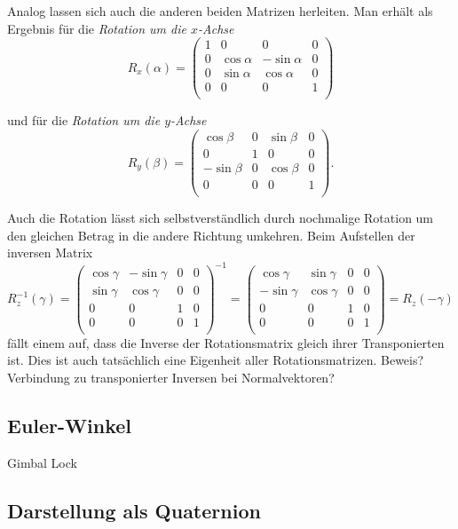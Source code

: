 Analog lassen sich auch die anderen beiden Matrizen herleiten. Man erhält als Ergebnis für die \emph{Rotation um die $x$-Achse}
\begin{equation}
 R_x{(\alpha)}
 = 
 \begin{pmatrix}
  1 & 0 & 0 & 0 \\
  0 & \cos \alpha & -\sin \alpha & 0 \\
  0 & \sin \alpha &  \cos \alpha & 0 \\
  0 & 0 & 0 & 1 \\
 \end{pmatrix}
\end{equation}

und für die \emph{Rotation um die $y$-Achse}
\begin{equation}
 R_y{(\beta)}
 = 
 \begin{pmatrix}
  \cos \beta & 0 & \sin \beta & 0 \\
  0 & 1 & 0 & 0 \\
  -\sin \beta & 0 & \cos \beta & 0 \\
  0 & 0 & 0 & 1 \\
 \end{pmatrix}.
\end{equation}

Auch die Rotation lässt sich selbstverständlich durch nochmalige Rotation um den gleichen Betrag in die andere Richtung umkehren. Beim Aufstellen der inversen Matrix
\begin{equation}
 R_z^{-1}{(\gamma)}
 = 
 \begin{pmatrix}
  \cos \gamma & -\sin \gamma & 0 & 0 \\
  \sin \gamma &  \cos \gamma & 0 & 0 \\
  0 & 0 & 1 & 0 \\
  0 & 0 & 0 & 1 \\
 \end{pmatrix}^{-1}
 = 
 \begin{pmatrix}
   \cos \gamma & \sin \gamma & 0 & 0 \\
  -\sin \gamma & \cos \gamma & 0 & 0 \\
  0 & 0 & 1 & 0 \\
  0 & 0 & 0 & 1 \\
 \end{pmatrix}
 = R_z{(-\gamma)}
\end{equation}
fällt einem auf, dass die Inverse der Rotationsmatrix gleich ihrer Transponierten ist. Dies ist auch tatsächlich eine Eigenheit aller Rotationsmatrizen. Beweis? Verbindung zu transponierter Inversen bei Normalvektoren?

\subsection{Euler-Winkel}
Gimbal Lock

\subsection{Darstellung als Quaternion}